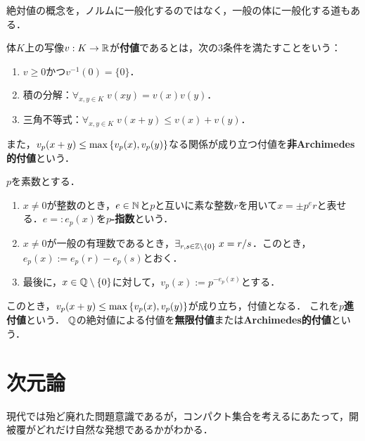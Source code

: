 \documentclass[uplatex,dvipdfmx]{jsreport}
\begin{document}
\begin{tcolorbox}[colframe=ForestGreen, colback=ForestGreen!10!white,breakable,colbacktitle=ForestGreen!40!white,coltitle=black,fonttitle=\bfseries\sffamily,
title=]
    絶対値の概念を，ノルムに一般化するのではなく，一般の体に一般化する道もある．
\end{tcolorbox}

\begin{definition}[valuation]
    体$K$上の写像$v:K\to\mathbb{R}$が\textbf{付値}であるとは，次の3条件を満たすことをいう：
    \begin{enumerate}
        \item $v\ge0$かつ$v^{-1}(0)=\{0\}$．
        \item 積の分解：$\forall_{x,y\in K}\;v(xy)=v(x)v(y)$．
        \item 三角不等式：$\forall_{x,y\in K}\;v(x+y)\le v(x)+v(y)$．
    \end{enumerate}
    また，$v_p(x+y)\le\max\left\{v_p(x),v_p(y)\right\}$なる関係が成り立つ付値を\textbf{非Archimedes的付値}という．
\end{definition}

\begin{example}
    $p$を素数とする．
    \begin{enumerate}
        \item $x\ne0$が整数のとき，$e\in\mathbb{N}$と$p$と互いに素な整数$r$を用いて$x=\pm p^er$と表せる．$e=:e_p(x)$を\textbf{$p$-指数}という．
        \item $x\ne0$が一般の有理数であるとき，$\exists_{r,s\in\mathbb{Z}\setminus\{0\}}\;x=r/s$．このとき，$e_p(x):=e_p(r)-e_p(s)$とおく．
        \item 最後に，$x\in\mathbb{Q}\setminus\{0\}$に対して，$v_p(x):=p^{-e_p(x)}$とする．
    \end{enumerate}
    このとき，$v_p(x+y)\le\max\left\{v_p(x),v_p(y)\right\}$が成り立ち，付値となる．
    これを\textbf{$p$進付値}という．
    $\mathbb{Q}$の絶対値による付値を\textbf{無限付値}または\textbf{Archimedes的付値}という．
\end{example}

\begin{theorem}[付値が定める距離空間]
    
\end{theorem}

\section{次元論}

\begin{tcolorbox}[colframe=ForestGreen, colback=ForestGreen!10!white,breakable,colbacktitle=ForestGreen!40!white,coltitle=black,fonttitle=\bfseries\sffamily,
title=]
    現代では殆ど廃れた問題意識であるが，コンパクト集合を考えるにあたって，開被覆がどれだけ自然な発想であるかがわかる．
\end{tcolorbox}
\end{document}
